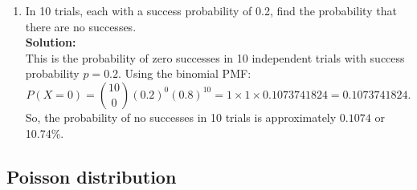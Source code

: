 \documentclass{book}
\begin{document}
\begin{enumerate}
    \item In 10 trials, each with a success probability of 0.2, find the probability that there are no successes. \\
    
    \textbf{Solution:} \\
    
    This is the probability of zero successes in 10 independent trials with success probability \(p=0.2\). Using the binomial PMF:
    \[
    P(X=0) = \binom{10}{0} (0.2)^0 (0.8)^{10} = 1 \times 1 \times 0.1073741824 = 0.1073741824.
    \]
    So, the probability of no successes in 10 trials is approximately \(\boxed{0.1074}\) or 10.74\%.
    
\end{enumerate}

\subsection*{Poisson distribution}
\end{document}
